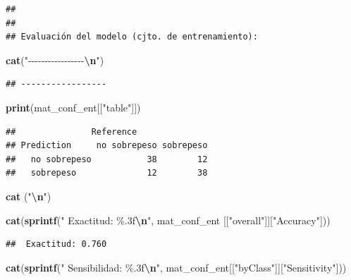 \documentclass[
]{article}
\newenvironment{Shaded}{\begin{snugshade}}{\end{snugshade}}
\newcommand{\FunctionTok}[1]{\textcolor[rgb]{0.13,0.29,0.53}{\textbf{#1}}}
\newcommand{\NormalTok}[1]{#1}
\newcommand{\SpecialCharTok}[1]{\textcolor[rgb]{0.81,0.36,0.00}{\textbf{#1}}}
\newcommand{\StringTok}[1]{\textcolor[rgb]{0.31,0.60,0.02}{#1}}
\begin{document}
\begin{verbatim}
## 
## 
## Evaluación del modelo (cjto. de entrenamiento):
\end{verbatim}

\begin{Shaded}
\begin{Highlighting}[]
\FunctionTok{cat}\NormalTok{(}\StringTok{"{-}{-}{-}{-}{-}{-}{-}{-}{-}{-}{-}{-}{-}{-}{-}{-}{-}}\SpecialCharTok{\textbackslash{}n}\StringTok{"}\NormalTok{)}
\end{Highlighting}
\end{Shaded}

\begin{verbatim}
## -----------------
\end{verbatim}

\begin{Shaded}
\begin{Highlighting}[]
\FunctionTok{print}\NormalTok{(mat\_conf\_ent[[}\StringTok{"table"}\NormalTok{]])}
\end{Highlighting}
\end{Shaded}

\begin{verbatim}
##               Reference
## Prediction     no sobrepeso sobrepeso
##   no sobrepeso           38        12
##   sobrepeso              12        38
\end{verbatim}

\begin{Shaded}
\begin{Highlighting}[]
\FunctionTok{cat}\NormalTok{ (}\StringTok{"}\SpecialCharTok{\textbackslash{}n}\StringTok{"}\NormalTok{)}
\end{Highlighting}
\end{Shaded}

\begin{Shaded}
\begin{Highlighting}[]
\FunctionTok{cat}\NormalTok{(}\FunctionTok{sprintf}\NormalTok{(}\StringTok{" Exactitud: \%.3f}\SpecialCharTok{\textbackslash{}n}\StringTok{"}\NormalTok{, mat\_conf\_ent [[}\StringTok{"overall"}\NormalTok{]][}\StringTok{"Accuracy"}\NormalTok{]))}
\end{Highlighting}
\end{Shaded}

\begin{verbatim}
##  Exactitud: 0.760
\end{verbatim}

\begin{Shaded}
\begin{Highlighting}[]
\FunctionTok{cat}\NormalTok{(}\FunctionTok{sprintf}\NormalTok{(}\StringTok{" Sensibilidad: \%.3f}\SpecialCharTok{\textbackslash{}n}\StringTok{"}\NormalTok{, mat\_conf\_ent[[}\StringTok{"byClass"}\NormalTok{]][}\StringTok{"Sensitivity"}\NormalTok{]))}
\end{Highlighting}
\end{Shaded}
\end{document}
